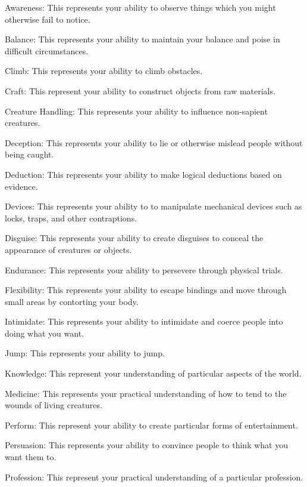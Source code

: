         \begin{raggeditemize}
            \item Awareness: This represents your ability to observe things which you might otherwise fail to notice.
            \item Balance: This represents your ability to maintain your balance and poise in difficult circumstances.
            \item Climb: This represents your ability to climb obstacles.
            \item Craft: This represent your ability to construct objects from raw materials.
            \item Creature Handling: This represents your ability to influence non-sapient creatures.
            \item Deception: This represents your ability to lie or otherwise mislead people without being caught.
            \item Deduction: This represents your ability to make logical deductions based on evidence.
            \item Devices: This represents your ability to to manipulate mechanical devices such as locks, traps, and other contraptions.
            \item Disguise: This represents your ability to create disguises to conceal the appearance of creatures or objects.
            \item Endurance: This represents your ability to persevere through physical trials.
            \item Flexibility: This represents your ability to escape bindings and move through small areas by contorting your body.
            \item Intimidate: This represents your ability to intimidate and coerce people into doing what you want.
            \item Jump: This represents your ability to jump.
            \item Knowledge: This represent your understanding of particular aspects of the world.
            \item Medicine: This represents your practical understanding of how to tend to the wounds of living creatures.
            \item Perform: This represent your ability to create particular forms of entertainment.
            \item Persuasion: This represents your ability to convince people to think what you want them to.
            \item Profession: This represent your practical understanding of a particular profession.

\end{raggeditemize}
